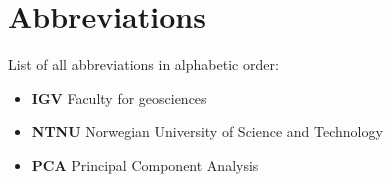 \chapter*{Abbreviations}



List of all abbreviations in alphabetic order:

\begin{itemize}
    \item \textbf{IGV} Faculty for geosciences
    \item \textbf{NTNU} Norwegian University of Science and Technology
    \item \textbf{PCA} Principal Component Analysis
    
\end{itemize}